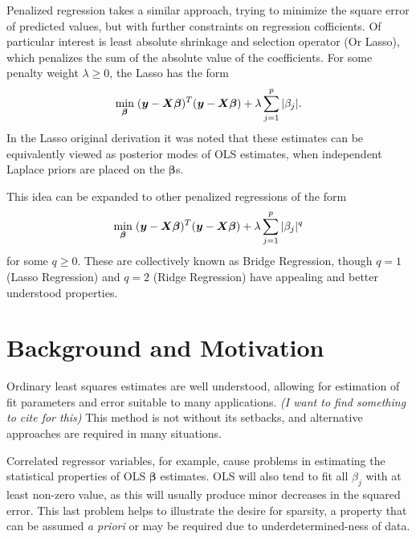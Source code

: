 \documentclass{uwstat572}
\begin{document}
Penalized regression takes a similar approach, trying to minimize the square error of predicted values, but with further constraints on regression cofficients. Of particular interest is least absolute shrinkage and selection operator (Or Lasso), which penalizes the sum of the absolute value of the coefficients. For some penalty weight $\lambda \geq 0$, the Lasso has the form \[
\min_{\boldsymbol{\beta}}  \hspace{.1cm} (\boldsymbol{y}-\boldsymbol{X}\boldsymbol{\beta})^T(\boldsymbol{y}-\boldsymbol{X}\boldsymbol{\beta})+\lambda\sum_{j=1}^p|\beta_j|.
\] In the Lasso original derivation it was noted that these estimates can be equivalently viewed as posterior modes of OLS estimates, when independent Laplace priors are placed on the $\boldsymbol{\beta}$s.\cite{tibshirani1996regression}

This idea can be expanded to other penalized regressions of the form  \[
\min_{\boldsymbol{\beta}}  \hspace{.1cm} (\boldsymbol{y}-\boldsymbol{X}\boldsymbol{\beta})^T(\boldsymbol{y}-\boldsymbol{X}\boldsymbol{\beta})+\lambda\sum_{j=1}^p|\beta_j|^q
\] for some $q\geq0$.\cite{park2008bayesian} These are collectively known as Bridge Regression, though $q=1$ (Lasso Regression) and $q=2$ (Ridge Regression) have appealing and better understood properties.

\section{Background and Motivation}\label{Motivation}
Ordinary least squares estimates are well understood, allowing for estimation of fit parameters and error suitable to many applications.\emph{\color{red} (I want to find something to cite for this) \color{black}} This method is not without its setbacks, and alternative approaches are required in many situations. 

Correlated regressor variables, for example, cause problems in estimating the statistical properties of OLS $\boldsymbol{\beta}$ estimates. OLS will also tend to fit all $\beta_j$ with at least non-zero value, as this will usually produce minor decreases in the squared error.\cite{seeger2008bayesian} This last problem helps to illustrate the desire for sparsity, a property that can be assumed \emph{a priori} or may be required due to underdetermined-ness of data.
\end{document}
